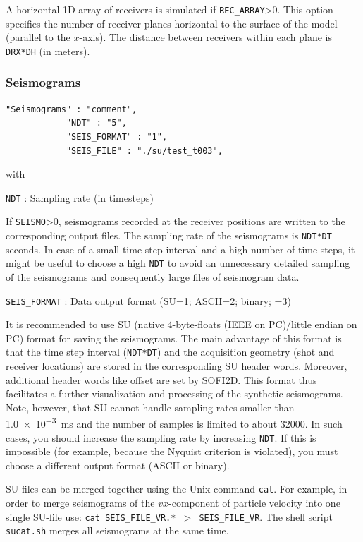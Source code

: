 A horizontal 1D array of receivers is simulated if \texttt{REC\_ARRAY}>0. This option specifies the number of receiver planes horizontal to the surface of the model (parallel to the $x$-axis). The distance between receivers within each plane is \texttt{DRX*DH} (in meters).

\subsubsection{Seismograms}
\label{seismograms}
\begin{verbatim}
"Seismograms" : "comment",
            "NDT" : "5",
            "SEIS_FORMAT" : "1",
            "SEIS_FILE" : "./su/test_t003",
\end{verbatim}

with

\texttt{NDT} : Sampling rate (in timesteps)

If \texttt{SEISMO}>0, seismograms recorded at the receiver positions are written to the corresponding output files. The sampling rate of the seismograms is \texttt{NDT*DT} seconds. In case of a small time step interval and a high number of time steps, it might be useful to choose a high \texttt{NDT} to avoid an unnecessary detailed sampling of the seismograms and consequently large files of seismogram data.

\texttt{SEIS\_FORMAT} : Data output format (SU=1; ASCII=2; binary; =3)

It is recommended to use SU (native 4-byte-floats (IEEE on PC)/little endian on PC) format for saving the seismograms. The main advantage of this format is that the time step interval (\texttt{NDT*DT}) and the acquisition geometry (shot and receiver locations) are stored in the corresponding SU header words. Moreover, additional header words like offset are set by SOFI2D. This format thus facilitates a further visualization and processing of the synthetic seismograms. Note, however, that SU cannot handle sampling rates smaller than \SI{1.0e-3}{ms} and the number of samples is limited to about \SI{32000}{}. In such cases, you should increase the sampling rate by increasing \texttt{NDT}. If this is impossible (for example, because the Nyquist criterion is violated), you must choose a different output format (ASCII or binary). 

SU-files can be merged together using the Unix command \texttt{cat}. For example, in order to merge seismograms of the $vx$-component of particle velocity into one single SU-file use: \texttt{cat SEIS\_FILE\_VR.* $>$ SEIS\_FILE\_VR}. The shell script \texttt{sucat.sh} merges all seismograms at the same time.

